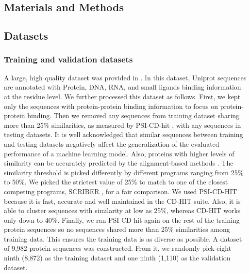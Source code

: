 \documentclass{bioinfo}
\begin{document}
\begin{methods}
\section{Materials and Methods}
\subsection{Datasets}
\subsubsection{Training and validation datasets}
A large, high quality dataset was provided in \citep{zhang2019comprehensive}. In this dataset, Uniprot sequences are annotated with Protein, DNA, RNA, and small ligands binding information at the residue level. We further processed this dataset as follows. First, we kept only the sequences with protein-protein binding information to focus on protein-protein binding. Then we removed any sequences from training dataset sharing more than 25\% similarities, as measured by PSI-CD-hit \citep{li2006cd,fu2012cd}, with any sequences in testing datasets. It is well acknowledged that similar sequences between training and testing datasets negatively affect the generalization of the evaluated performance of a machine learning model. Also, proteins with higher levels of similarity can be accurately predicted by the alignment-based methods \citep{zhang2018review}. The similarity threshold is picked differently by different programs ranging from 25\% to 50\%. We picked the strictest value of 25\% to match to one of the closest competing programs, SCRIBER \citep{zhang2019scriber}, for a fair comparison. We used PSI-CD-HIT because it is fast, accurate and well maintained in the CD-HIT suite. Also, it is able to cluster sequences with similarity at low as 25\%, whereas CD-HIT works only down to 40\%. Finally, we ran PSI-CD-hit again on the rest of the training protein sequences so no sequences shared more than 25\% similarities among training data. This ensures the training data is as diverse as possible. A dataset of 9,982 protein sequences was constructed. From it, we randomly pick eight ninth (8,872) as the training dataset and one ninth (1,110) as the validation dataset.


\end{methods}
\end{document}
